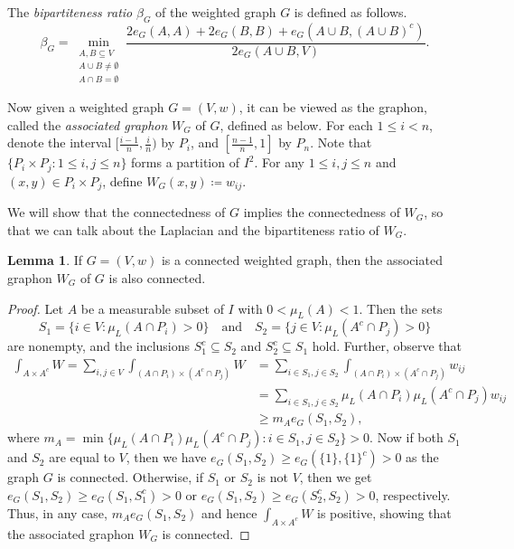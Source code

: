 \documentclass[12pt,a4paper,bold]{thesis}
\theoremstyle{definition}
\newtheorem{lemma}[thm]{Lemma}
\begin{document}
The \emph{bipartiteness ratio} $\beta_G$ of the weighted graph $G$ is defined as follows.
\begin{equation*}
    \beta_G = \min_{\substack{A,B \subseteq V \\ A \cup B \neq \emptyset \\
    A \cap B = \emptyset}} \frac{2 e_G(A,A) + 2 e_G(B,B) + e_G(A \cup B, (A \cup B)^c)}
    {2 e_G(A \cup B,V)}.
\end{equation*}

Now given a weighted graph $G = (V, w)$, it can be viewed as the graphon, 
called the \emph{associated graphon} $W_G$ of $G$, defined as below. 
For each $1 \leq i < n$, denote the interval $[\frac{i-1}{n}, \frac{i}{n})$ by $P_i$, 
and $[\frac{n-1}{n}, 1]$ by $P_n$. Note that $\{P_i \times P_j : 1 \leq i,j \leq n\}$ 
forms a partition of $I^2$. For any $1 \leq i,j \leq n$ and $(x,y) \in P_i \times P_j$, 
define $W_G(x,y) \coloneq w_{ij}$.

We will show that the connectedness of $G$ implies the connectedness of $W_G$,
so that we can talk about the Laplacian and the bipartiteness ratio of $W_G$.

\begin{lemma}
    If $G = (V, w)$ is a connected weighted graph, then the associated graphon $W_G$ 
    of $G$ is also connected.
\end{lemma}

\begin{proof}
    Let $A$ be a measurable subset of $I$ with $0 < \mu_L(A) < 1$. Then the sets
    \begin{equation*}
        S_1 = \{i \in V : \mu_L(A \cap P_i) > 0\} \quad \text{and} \quad 
        S_2 = \{j \in V : \mu_L(A^c \cap P_j) > 0\}
    \end{equation*}
    are nonempty, and the inclusions $S_1^c \subseteq S_2$ and $S_2^c \subseteq S_1$
    hold. Further, observe that
    \begin{align*}
        \int_{A \times A^c} W 
        = \sum_{i,j \in V} \int_{(A \cap P_i) \times (A^c \cap P_j)} W 
        & = 
        \sum_{i \in S_1, j \in S_2} \int_{(A \cap P_i) \times (A^c \cap P_j)} w_{ij}
        \\
        & = 
        \sum_{i \in S_1, j \in S_2} \mu_L(A \cap P_i) \mu_L(A^c \cap P_j) w_{ij}
        \\
        & \geq
        m_A e_G(S_1,S_2),
    \end{align*} 
    where $m_A = \min\{\mu_L(A \cap P_i) \mu_L(A^c \cap P_j) : i \in S_1, j \in S_2\} > 0$.
    Now if both $S_1$ and $S_2$ are equal to $V$, then we have $e_G(S_1,S_2) \geq 
    e_G(\{1\},\{1\}^c) > 0$ as the graph $G$ is connected. Otherwise,
    if $S_1$ or $S_2$ is not $V$, then we get $e_G(S_1,S_2) \geq e_G(S_1,S_1^c) > 0$
    or $e_G(S_1,S_2) \geq e_G(S_2^c,S_2) > 0$, respectively. Thus, in any case,
    $m_A e_G(S_1,S_2)$ and hence $\int_{A \times A^c} W$ is positive, showing that
    the associated graphon $W_G$ is connected. 
\end{proof}
\end{document}
